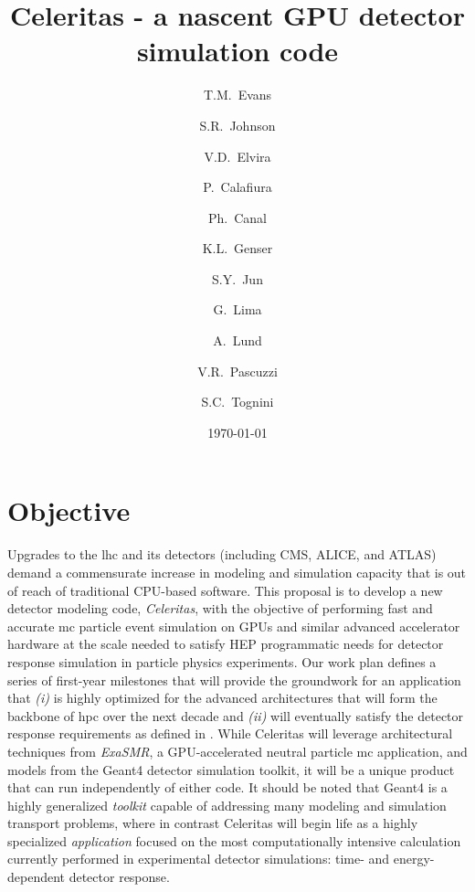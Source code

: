 \documentclass[10pt]{article}
\author[1]{T.M.~Evans}
\author[1]{S.R.~Johnson}
\author[2]{V.D.~Elvira}
\author[3]{P.~Calafiura}
\author[2]{Ph.~Canal}
\author[2]{K.L.~Genser}
\author[2]{S.Y.~Jun}
\author[2]{G.~Lima}
\author[4]{A.~Lund}
\author[3]{V.R.~Pascuzzi}
\author[1]{S.C.~Tognini}
\affil[1]{Oak Ridge National Laboratory}
\affil[2]{Fermi National Accelerator Laboratory}
\affil[3]{Lawrence Berkeley National Laboratory}
\affil[4]{Argonne National Laboratory}
\title{Celeritas - a nascent GPU detector simulation code}
\date{\today}
\begin{document}
\maketitle

\section*{Objective}

Upgrades to the \ac{lhc} and its detectors (including CMS, ALICE, and
ATLAS) demand a commensurate increase in modeling and simulation
capacity that is out of reach of traditional CPU-based software.
This proposal is to develop a new detector modeling code, \emph{Celeritas},
with the objective of performing fast and accurate \ac{mc} particle event
simulation on GPUs
and similar advanced accelerator hardware at the scale needed to satisfy HEP
programmatic needs for detector response simulation in particle physics
experiments. Our work plan defines a series of first-year milestones that will
provide the groundwork for an application that \textsl{(i)} is highly optimized
for the advanced architectures that will form the backbone of \ac{hpc}
over the next decade and \textsl{(ii)} will eventually satisfy the detector
response requirements as
defined in  \cite{the_hep_software_foundation_roadmap_2019}. While Celeritas will
leverage architectural techniques from \emph{ExaSMR}, a GPU-accelerated neutral
particle \ac{mc} application, and models from the Geant4 detector simulation toolkit, it will be a unique product that can run independently of either code.
It should be noted that Geant4 is a
highly generalized \emph{toolkit} capable of addressing many modeling and
simulation transport problems, where in contrast
Celeritas will begin life as a highly specialized \emph{application} focused on
the most computationally intensive calculation currently performed in
experimental detector simulations: time- and energy-dependent detector response.


\end{document}

